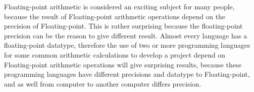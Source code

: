 \documentclass[11pt]{article}
\begin{document}
Floating-point arithmetic is considered an exciting subject for many people, because the result of Floating-point arithmetic operations depend on the precision of Floating-point. This is rather surprising because the floating-point precision can be the reason to give different result. Almost every language has a floating-point datatype, therefore the use of two or more programming languages for some common arithmetic calculations to develop a project depend on Floating-point arithmetic operations will give surprising results, because these programming languages have different precisions and datatype to Floating-point, and as well from computer to another computer differs precision.\\

\end{document}
